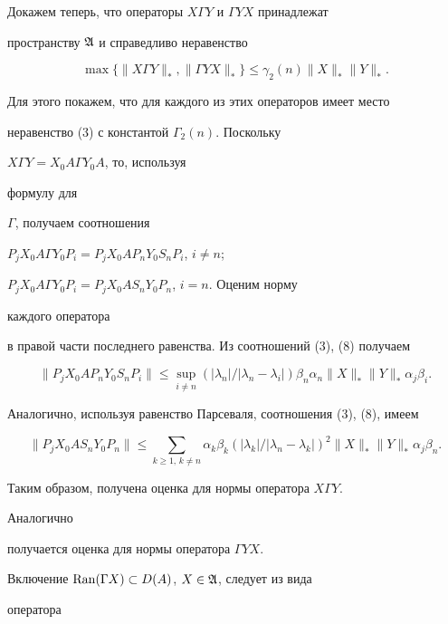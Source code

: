 Докажем теперь, что операторы $X\Gamma Y$ и $\Gamma YX$ принадлежат


пространству $\frak A$ и справедливо неравенство


\begin{equation}


\max\{\|X\Gamma Y\|_*,\|\Gamma YX\|_*\}\le


\gamma_2(n)\|X\|_*\|Y\|_*.


\end{equation}


Для этого покажем, что для каждого из этих операторов имеет место


неравенство (3) с константой $\Gamma_2(n)$. Поскольку


$X\Gamma Y=X_0A\Gamma Y_0A$, то, используя


формулу для


$\Gamma$, получаем соотношения


$P_jX_0A\Gamma Y_0P_i=P_jX_0AP_nY_0S_nP_i$, $i\ne n$;


$P_jX_0A \Gamma Y_0P_i=P_jX_0AS_nY_0P_n$, $i=n$. Оценим норму


каждого оператора


в правой части последнего равенства. Из соотношений (3), (8) получаем


$$


\|P_jX_0AP_nY_0S_nP_i\|\le\sup_{i\ne n}


(|\lambda_n|/|\lambda_n-\lambda_i|)\beta_n\alpha_n


\|X\|_*\|Y\|_*\alpha_j\beta_i.


$$


Аналогично, используя равенство Парсеваля, соотношения (3), (8), имеем


$$


\|P_jX_0AS_nY_0P_n\|\le\sum_{k\ge 1,\,k\ne n}


\alpha_k\beta_k(|\lambda_k|/|\lambda_n-\lambda_k|)^2


\|X\|_*\|Y\|_*\alpha_j\beta_n.


$$


Таким образом, получена оценка для нормы оператора $X\Gamma Y$.


Аналогично


получается оценка для нормы оператора $\Gamma YX$.





Включение $\operatorname{Ran}(\Gamma X)\subset D(A)$, $X\in\frak A$, следует из вида


оператора


